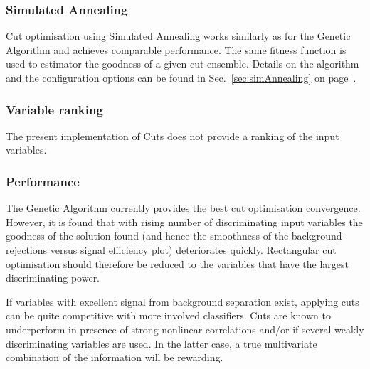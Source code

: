 \subsubsection*{Simulated Annealing}

Cut optimisation using Simulated Annealing works similarly as for the Genetic 
Algorithm and achieves comparable performance. The same fitness 
function is used to estimator the goodness of a given cut ensemble. Details 
on the algorithm and the configuration options can be found in 
Sec.~\ref{sec:simAnnealing} on page~\pageref{sec:simAnnealing}.

\subsubsection{Variable ranking}

The present implementation of Cuts does not provide a ranking of 
the input variables.

\subsubsection{Performance}

The Genetic Algorithm currently provides the best cut optimisation convergence. 
However, it is found that with rising number of discriminating input variables the 
goodness of the solution found (and hence the smoothness of the background-rejections 
versus signal efficiency plot) deteriorates quickly. Rectangular cut optimisation
should therefore be reduced to the variables that have the largest discriminating
power. 

If variables with excellent signal from background separation exist, applying cuts
can be quite competitive with more involved classifiers. Cuts are known to underperform
in presence of strong nonlinear correlations and/or if several weakly discriminating 
variables are used. In the latter case, a true multivariate combination of the information
will be rewarding.


